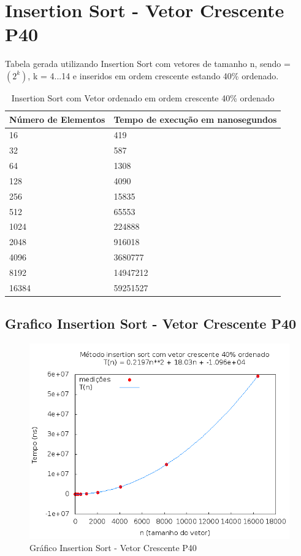 \documentclass[12pt,a4paper,twoside]{report}
\begin{document}
\section{Insertion Sort - Vetor Crescente P40}
Tabela gerada utilizando Insertion Sort com vetores de tamanho n, sendo = $(2^k)$, k = 4...14 e inseridos em ordem crescente estando 40\% ordenado.

\begin{table}[H]
\centering
\caption{Insertion Sort com Vetor ordenado em ordem crescente 40\% ordenado}
\label{my-label}
\begin{tabular}{|l|l|}
\hline
\multicolumn{1}{|c|}{\textbf{Número de Elementos}} & \multicolumn{1}{c|}{\textbf{Tempo de execução em nanosegundos}} \\ \hline
16 & 419 \\ \hline
32 & 587 \\ \hline
64 & 1308 \\ \hline
128 & 4090 \\ \hline
256 & 15835 \\ \hline
512 & 65553 \\ \hline
1024 & 224888 \\ \hline
2048 & 916018 \\ \hline
4096 & 3680777 \\ \hline
8192 & 14947212 \\ \hline
16384 & 59251527 \\ \hline
\end{tabular}
\end{table}

\subsection{Grafico Insertion Sort - Vetor Crescente P40}
\begin{figure}[H]
    \centering
    \includegraphics[width=0.7\linewidth]{graficos/Insertion/vIntCrescenteP40/vIntCrescenteP40.png}
  \caption{Gráfico Insertion Sort - Vetor Crescente P40}
\end{figure}
\end{document}
